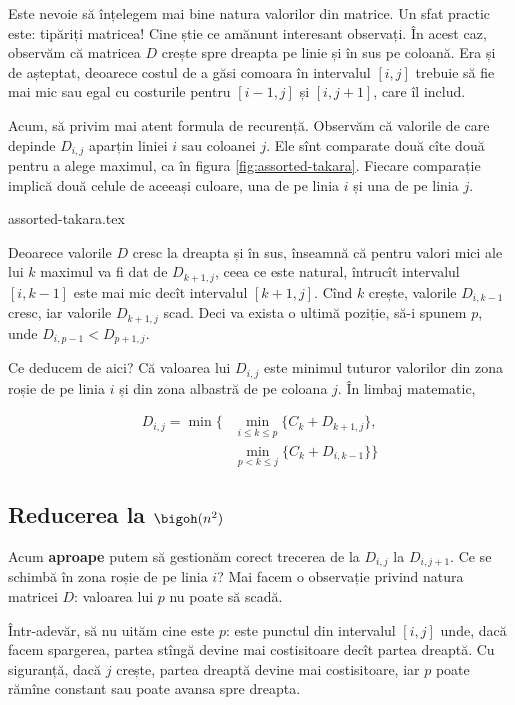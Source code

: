 Este nevoie să înțelegem mai bine natura valorilor din matrice. Un sfat practic este: tipăriți matricea! Cine știe ce amănunt interesant observați. În acest caz, observăm că matricea $D$ crește spre dreapta pe linie și în sus pe coloană. Era și de așteptat, deoarece costul de a găsi comoara în intervalul $[i, j]$ trebuie să fie mai mic sau egal cu costurile pentru $[i - 1, j]$ și $[i, j + 1]$, care îl includ.

Acum, să privim mai atent formula de recurență. Observăm că valorile de care depinde $D_{i,j}$ aparțin liniei $i$ sau coloanei $j$. Ele sînt comparate două cîte două pentru a alege maximul, ca în figura \ref{fig:assorted-takara}. Fiecare comparație implică două celule de aceeași culoare, una de pe linia $i$ și una de pe linia $j$.

{assorted-takara.tex}

Deoarece valorile $D$ cresc la dreapta și în sus, înseamnă că pentru valori mici ale lui $k$ maximul va fi dat de $D_{k+1, j}$, ceea ce este natural, întrucît intervalul $[i, k - 1]$ este mai mic decît intervalul $[k + 1, j]$. Cînd $k$ crește, valorile $D_{i,k-1}$ cresc, iar valorile $D_{k+1,j}$ scad. Deci va exista o ultimă poziție, să-i spunem $p$, unde $D_{i,p-1} < D_{p+1,j}$.

Ce deducem de aici? Că valoarea lui $D_{i, j}$ este minimul tuturor valorilor din zona roșie de pe linia $i$ și din zona albastră de pe coloana $j$. În limbaj matematic,

\begin{align*}
  D_{i,j} = \min \big\{ & \min_{i \leq k \leq p} \{ C_k + D_{k+1, j} \},\\
  & \min_{p < k \leq j} \{ C_k + D_{i, k-1} \} \big\}
\end{align*}

\subsection{Reducerea la \texorpdfstring{$\bigoh(n^2)$}{O(n2)}}

Acum \textbf{aproape} putem să gestionăm corect trecerea de la $D_{i,j}$ la $D_{i,j+1}$. Ce se schimbă în zona roșie de pe linia $i$? Mai facem o observație privind natura matricei $D$: valoarea lui $p$ nu poate să scadă.

Într-adevăr, să nu uităm cine este $p$: este punctul din intervalul $[i, j]$ unde, dacă facem spargerea, partea stîngă devine mai costisitoare decît partea dreaptă. Cu siguranță, dacă $j$ crește, partea dreaptă devine mai costisitoare, iar $p$ poate rămîne constant sau poate avansa spre dreapta.

